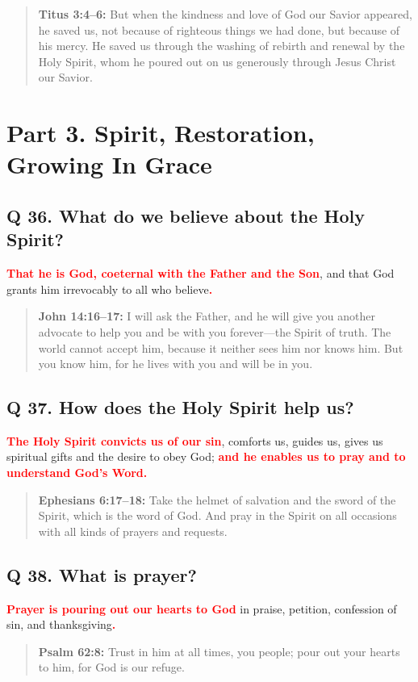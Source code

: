 \documentclass[titlepage]{memoir}
\newcommand\Children[1]{\textbf{\textcolor{red}{#1}}}
\newcommand\Quote[2]{\begin{quote}{\small\textbf{#1:}{ #2}}\end{quote}}
\begin{document}
\Quote{Titus 3:4--6}{But when the kindness and love of God our Savior appeared, he saved us, not because of righteous things we had done, but because of his mercy. He saved us through the washing of rebirth and renewal by the Holy Spirit, whom he poured out on us generously through Jesus Christ our Savior.}

\section[Part 3. Spirit, Restoration, Growing In Grace][Spirit, Restoration, Growing In Grace]{Part 3. Spirit, Restoration, Growing In Grace}

\subsection{Q 36. What do we believe about the Holy Spirit?}
\Children{That he is God, coeternal with the Father and the Son}, and that God grants him irrevocably to all who believe\Children{.}

\Quote{John 14:16--17}{I will ask the Father, and he will give you another advocate to help you and be with you forever\thinspace{}---\thinspace{}the Spirit of truth. The world cannot accept him, because it neither sees him nor knows him. But you know him, for he lives with you and will be in you.}

\subsection{Q 37. How does the Holy Spirit help us?}
\Children{The Holy Spirit convicts us of our sin}, comforts us, guides us, gives us spiritual gifts and the desire to obey God; \Children{and he enables us to pray and to understand God's Word.}

\Quote{Ephesians 6:17--18}{Take the helmet of salvation and the sword of the Spirit, which is the word of God. And pray in the Spirit on all occasions with all kinds of prayers and requests.}

\subsection{Q 38. What is prayer?}
\Children{Prayer is pouring out our hearts to God} in praise, petition, confession of sin, and thanksgiving\Children{.}

\Quote{Psalm 62:8}{Trust in him at all times, you people; pour out your hearts to him, for God is our refuge.}
\end{document}
